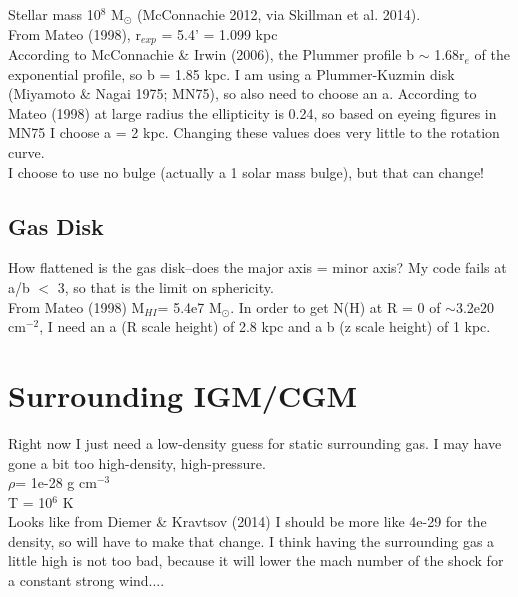 \documentclass[12pt,preprint]{aastex}
\begin{document}
Stellar mass 10$^8$ M$_{\odot}$ (McConnachie 2012, via Skillman et al. 2014).  \\
From Mateo (1998), r$_{exp}$ = 5.4' = 1.099 kpc\\
According to McConnachie \& Irwin (2006), the Plummer profile b $\sim$ 1.68r$_e$ of the exponential profile, so b = 1.85 kpc.  I am using a Plummer-Kuzmin disk (Miyamoto \& Nagai 1975; MN75), so also need to choose an a. According to Mateo (1998) at large radius the ellipticity is 0.24, so based on eyeing figures in MN75 I choose a = 2 kpc.  Changing these values does very little to the rotation curve.\\

I choose to use no bulge (actually a 1 solar mass bulge), but that can change!\\

 
\subsection{Gas Disk}

How flattened is the gas disk--does the major axis = minor axis?  My code fails at a/b $<$ 3, so that is the limit on sphericity.\\

From Mateo (1998) M$_{HI}$= 5.4e7 M$_{\odot}$.  In order to get N(H) at R = 0 of $\sim$3.2e20 cm$^{-2}$, I need an a (R scale height) of 2.8 kpc and a b (z scale height) of 1 kpc.   

\section{Surrounding IGM/CGM}

Right now I just need a low-density guess for static surrounding gas.  I may have gone a bit too high-density, high-pressure.  \\
\indent $\rho$= 1e-28 g cm$^{-3}$\\
\indent T = 10$^6$ K\\

Looks like from Diemer \& Kravtsov (2014) I should be more like 4e-29 for the density, so will have to make that change.  I think having the surrounding gas a little high is not too bad, because it will lower the mach number of the shock for a constant strong wind....
\end{document}
